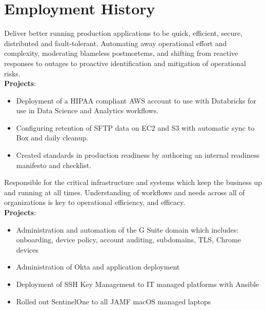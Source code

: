 \documentclass[letter,sans]{moderncv}
\begin{document}
\maketitle

\vspace{-0.6in}

\section{Employment History}

{Deliver better running production applications to be quick, efficient, secure, distributed and fault-tolerant. Automating away operational effort and complexity, moderating blameless postmortems, and shifting from reactive responses to outages to proactive identification and mitigation of operational risks.\\
  \textbf{Projects}:
  \begin{itemize}
  \item Deployment of a HIPAA compliant AWS account to use with Databricks for use in Data Science and Analytics workflows.
  \item Configuring retention of SFTP data on EC2 and S3 with automatic sync to Box and daily cleanup.
  \item Created standards in production readiness by authoring an internal readiness manifesto and checklist.
  \end{itemize}
}

{Responsible for the critical infrastructure and systems which keep the business up and running at all times. Understanding of workflows and needs across all of organizations is key to operational efficiency, and efficacy.\\
  \textbf{Projects}:
  \begin{itemize}
  \item Administration and automation of the G Suite domain which includes: onboarding, device policy, account auditing, subdomains, TLS, Chrome devices
  \item Administration of Okta and application deployment
  \item Deployment of SSH Key Management to IT managed platforms with Ansible
  \item Rolled out SentinelOne to all JAMF macOS managed laptops
  \end{itemize}
}
\end{document}
